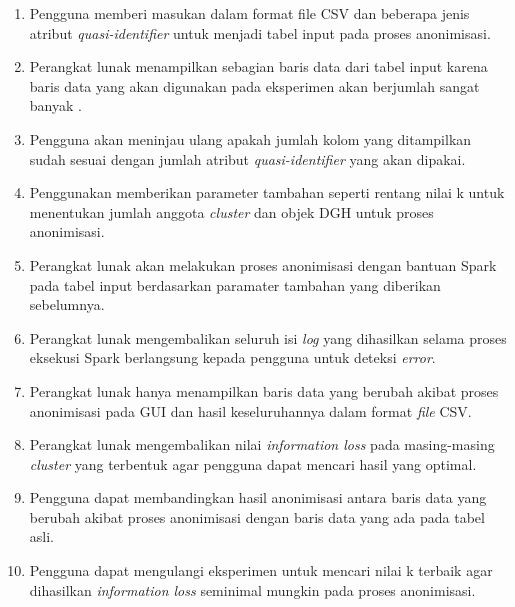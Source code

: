\documentclass[a4paper,twoside]{article}
\begin{document}
\begin{enumerate}
\begin{enumerate}

\item Pengguna memberi masukan dalam format file CSV dan beberapa jenis atribut \textit{quasi-identifier} untuk menjadi tabel input pada proses anonimisasi.

\item Perangkat lunak menampilkan sebagian baris data dari tabel input karena baris data yang akan digunakan pada eksperimen akan berjumlah sangat banyak .

\item Pengguna akan meninjau ulang apakah jumlah kolom yang ditampilkan sudah sesuai dengan jumlah atribut \textit{quasi-identifier} yang akan dipakai.

\item Penggunakan memberikan parameter tambahan seperti rentang nilai k untuk menentukan jumlah anggota \textit{cluster} dan objek DGH untuk proses anonimisasi.

\item Perangkat lunak akan melakukan proses anonimisasi dengan bantuan Spark pada tabel input berdasarkan paramater tambahan yang diberikan sebelumnya. 

\item Perangkat lunak mengembalikan seluruh isi \textit{log} yang dihasilkan selama proses eksekusi Spark berlangsung kepada pengguna untuk deteksi \textit{error}.

\item Perangkat lunak hanya menampilkan baris data yang berubah akibat proses anonimisasi pada GUI dan hasil keseluruhannya dalam format \textit{file} CSV.

\item Perangkat lunak mengembalikan nilai \textit{information loss} pada masing-masing \textit{cluster} yang terbentuk agar pengguna dapat mencari hasil yang optimal.

\item Pengguna dapat membandingkan hasil anonimisasi antara baris data yang berubah akibat proses anonimisasi dengan baris data yang ada pada tabel asli.

\item Pengguna dapat mengulangi eksperimen untuk mencari nilai k terbaik agar dihasilkan \textit{information loss} seminimal mungkin pada proses anonimisasi.


 
\end{enumerate}


\end{enumerate}
\end{document}
